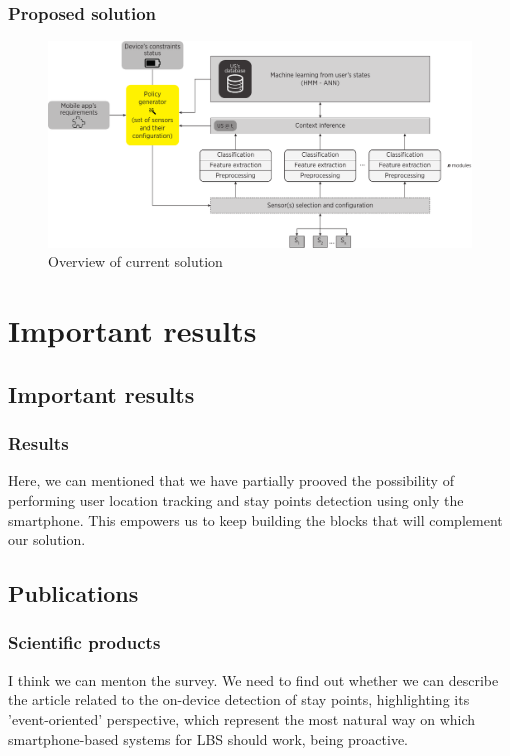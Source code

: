 \documentclass[compress,9pt,xcolor={dvipsnames,table}]{beamer}
\begin{document}
\begin{frame}[t]\frametitle{Proposed solution}
\begin{figure}[tb]
  \centering
  \includegraphics[width=\textwidth]{../../../resources/images/vectors/policy-manager-incorporation}
  \caption{Overview of current solution}
  \label{fig:solution}
\end{figure}
\end{frame}


\section{Important results}
\subsection{Important results}
\label{sub:important_results}
\begin{frame}[t]\frametitle{Results}
Here, we can mentioned that we have partially prooved the possibility of performing user location tracking and stay points detection using only the smartphone.
This empowers us to keep building the blocks that will complement our solution.
\end{frame}

\subsection{Publications}
\begin{frame}[t]\frametitle{Scientific products}
I think we can menton the survey.
We need to find out whether we can describe the article related to the on-device detection of stay points, highlighting its 'event-oriented' perspective, which represent the most natural way on which smartphone-based systems for LBS should work, being proactive.
\end{frame}
\end{document}
